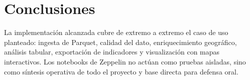 \section{Conclusiones}
La implementación alcanzada cubre de extremo a extremo el caso de uso planteado:
ingesta de Parquet, calidad del dato, enriquecimiento geográfico, análisis
tabular, exportación de indicadores y visualización con mapas interactivos.
Los notebooks de Zeppelin no actúan como pruebas aisladas, sino como síntesis
operativa de todo el proyecto y base directa para defensa oral.